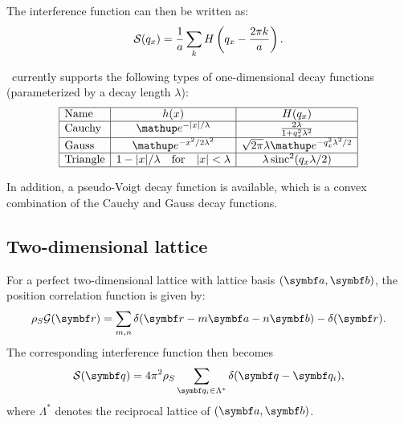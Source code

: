 The interference function can then be written as:
\begin{equation}
  \mathcal{S}(q_x) = \frac{1}{a}\sum_k H\left(q_x - \frac{2\pi k}{a}\right).
\end{equation}

\BornAgain\ currently supports the following types of one-dimensional decay functions
(parameterized by a decay length $\lambda$):
\begin{equation}
  \begin{array}{|l|c|c|}
    \hline
    \text{Name} & h(x) & H(q_x) \\
    \hline
    \text{Cauchy} & \e^{-|x|/\lambda} & \frac{2\lambda}{1+q_x^2\lambda^2} \\
    \hline
    \text{Gauss} & \e^{-x^2/2\lambda^2} & \sqrt{2\pi}\lambda \e^{-q_x^2\lambda^2/2} \\
    \hline
    \text{Triangle} & 1-|x|/\lambda \quad \text{for} \quad |x|<\lambda & \lambda \sinc^2(q_x\lambda/2) \\
    \hline
  \end{array}
\end{equation}

In addition, a pseudo-Voigt decay function is available,
which is a convex combination of the Cauchy and Gauss decay functions.

\subsection{Two-dimensional lattice} \label{sec:sect:2dlattice}

For a perfect two-dimensional lattice with lattice basis $(\v a,\v b)$, the position
correlation function is given by:
\begin{equation}
  \rho_S\GD(\r) = \sum_{m,n} \delta(\r-m\v a - n\v b) - \delta(\r).
\end{equation}
The corresponding interference function then becomes
\begin{equation}
  \SD(\q) = 4\pi^2 \rho_S \sum_{\q_i\in\Lambda^*} \delta(\q - \q_i),
\end{equation}
where $\Lambda^*$ denotes the reciprocal lattice of $(\v a,\v b)$.

